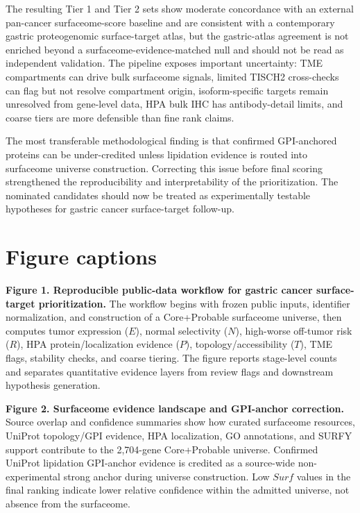 \documentclass[twocolumn]{article}
\begin{document}
The resulting Tier 1 and Tier 2 sets show moderate concordance with an external pan-cancer surfaceome-score baseline and are consistent with a contemporary gastric proteogenomic surface-target atlas, but the gastric-atlas agreement is not enriched beyond a surfaceome-evidence-matched null and should not be read as independent validation. The pipeline exposes important uncertainty: TME compartments can drive bulk surfaceome signals, limited TISCH2 cross-checks can flag but not resolve compartment origin, isoform-specific targets remain unresolved from gene-level data, HPA bulk IHC has antibody-detail limits, and coarse tiers are more defensible than fine rank claims.

The most transferable methodological finding is that confirmed GPI-anchored proteins can be under-credited unless lipidation evidence is routed into surfaceome universe construction. Correcting this issue before final scoring strengthened the reproducibility and interpretability of the prioritization. The nominated candidates should now be treated as experimentally testable hypotheses for gastric cancer surface-target follow-up.

\section*{Figure captions}

\textbf{Figure 1. Reproducible public-data workflow for gastric cancer surface-target prioritization.} The workflow begins with frozen public inputs, identifier normalization, and construction of a Core+\allowbreak{}Probable surfaceome universe, then computes tumor expression ($E$), normal selectivity ($N$), high-worse off-tumor risk ($R$), HPA protein/\allowbreak{}localization evidence ($P$), topology/\allowbreak{}accessibility ($T$), TME flags, stability checks, and coarse tiering. The figure reports stage-level counts and separates quantitative evidence layers from review flags and downstream hypothesis generation.

\textbf{Figure 2. Surfaceome evidence landscape and GPI-anchor correction.} Source overlap and confidence summaries show how curated surfaceome resources, UniProt topology/\allowbreak{}GPI evidence, HPA localization, GO annotations, and SURFY support contribute to the 2,704-gene Core+\allowbreak{}Probable universe. Confirmed UniProt lipidation GPI-anchor evidence is credited as a source-wide non-experimental strong anchor during universe construction. Low $Surf$ values in the final ranking indicate lower relative confidence within the admitted universe, not absence from the surfaceome.
\end{document}
